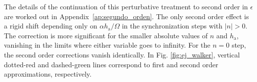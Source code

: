 \documentclass[prb,aps,twocolumn,superscriptaddress,floatfix]{revtex4-1}
\newcommand{\fabricom}[1]{{\color{green!60!blue}#1}}
\begin{document}
The details of the continuation of this perturbative treatment to second order in $\epsilon$ are worked out in Appendix~\ref{ap:segundo_orden}. The only second order effect is a rigid shift depending only on $\alpha h_\text{a}/\Omega$ in the synchronization steps with $|n|>0$. The correction is more significant for the smaller absolute values of $n$ and $h_\text{a}$, vanishing in the limits where either variable goes to infinity. For the $n=0$ step, the second order corrections vanish identically. In Fig. \ref{fig:ej_walker}, vertical dotted-red and  dashed-green lines correspond to first and second order approximations, respectively.

\end{document}
